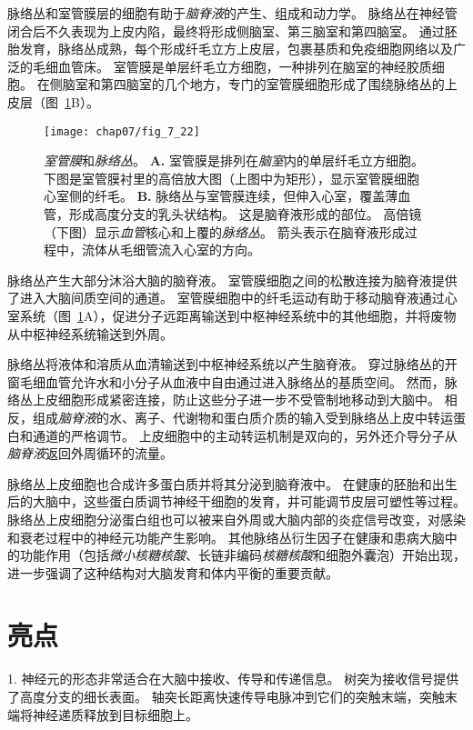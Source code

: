 脉络丛和室管膜层的细胞有助于\textit{脑脊液}的产生、组成和动力学。
脉络丛在神经管闭合后不久表现为上皮内陷，最终将形成侧脑室、第三脑室和第四脑室。
通过胚胎发育，脉络丛成熟，每个形成纤毛立方上皮层，包裹基质和免疫细胞网络以及广泛的毛细血管床。
室管膜是单层纤毛立方细胞，一种排列在脑室的神经胶质细胞。
在侧脑室和第四脑室的几个地方，专门的室管膜细胞形成了围绕脉络丛的上皮层（图~\ref{fig:7_22}B）。


\begin{figure}[htbp]
	\centering
	\texttt{[image: chap07/fig\_7\_22]}
	\caption{\textit{室管膜}和\textit{脉络丛}。
		\textbf{A.} 室管膜是排列在\textit{脑室}内的单层纤毛立方细胞。
		下图是室管膜衬里的高倍放大图（上图中为矩形），显示室管膜细胞心室侧的纤毛。
		\textbf{B.} 脉络丛与室管膜连续，但伸入心室，覆盖薄血管，形成高度分支的乳头状结构。
		这是脑脊液形成的部位。
		高倍镜（下图）显示\textit{血管}核心和上覆的\textit{脉络丛}。
		箭头表示在脑脊液形成过程中，流体从毛细管流入心室的方向。}
	\label{fig:7_22}
\end{figure}


脉络丛产生大部分沐浴大脑的脑脊液。
室管膜细胞之间的松散连接为脑脊液提供了进入大脑间质空间的通道。
室管膜细胞中的纤毛运动有助于移动脑脊液通过心室系统（图~\ref{fig:7_22}A），促进分子远距离输送到中枢神经系统中的其他细胞，并将废物从中枢神经系统输送到外周。


脉络丛将液体和溶质从血清输送到中枢神经系统以产生脑脊液。
穿过脉络丛的开窗毛细血管允许水和小分子从血液中自由通过进入脉络丛的基质空间。
然而，脉络丛上皮细胞形成紧密连接，防止这些分子进一步不受管制地移动到大脑中。
相反，组成\textit{脑脊液}的水、离子、代谢物和蛋白质介质的输入受到脉络丛上皮中转运蛋白和通道的严格调节。
上皮细胞中的主动转运机制是双向的，另外还介导分子从\textit{脑脊液}返回外周循环的流量。


脉络丛上皮细胞也合成许多蛋白质并将其分泌到脑脊液中。
在健康的胚胎和出生后的大脑中，这些蛋白质调节神经干细胞的发育，并可能调节皮层可塑性等过程。
脉络丛上皮细胞分泌蛋白组也可以被来自外周或大脑内部的炎症信号改变，对感染和衰老过程中的神经元功能产生影响。
其他脉络丛衍生因子在健康和患病大脑中的功能作用（包括\textit{微小核糖核酸}、长链非编码\textit{核糖核酸}和细胞外囊泡）开始出现，进一步强调了这种结构对大脑发育和体内平衡的重要贡献。



\section{亮点}

1. 神经元的形态非常适合在大脑中接收、传导和传递信息。
树突为接收信号提供了高度分支的细长表面。
轴突长距离快速传导电脉冲到它们的突触末端，突触末端将神经递质释放到目标细胞上。


